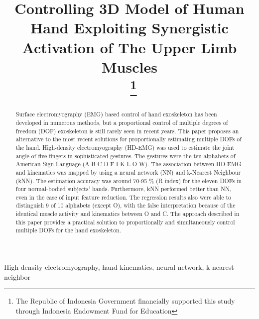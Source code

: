 \documentclass[conference]{IEEEtran}
\begin{document}
\title{Controlling 3D Model of Human Hand Exploiting Synergistic Activation of 
The Upper Limb Muscles\\\
\thanks{
The Republic of Indonesia Government financially supported this study through Indonesia Endowment Fund for Education}
}

\author{
}

\maketitle

\begin{abstract}
Surface electromyography (EMG) based control of hand exoskeleton has been developed in numerous methods, but a proportional control of multiple degrees of freedom (DOF) exoskeleton is still rarely seen in recent years. This paper proposes an alternative to the most recent solutions for proportionally estimating multiple DOFs of the hand. High-density electromyography (HD-EMG) was used to estimate the joint angle of five fingers in sophisticated gestures. The gestures were the ten alphabets of American Sign Language (A B C D F I K L O W). The association between HD-EMG and kinematics was mapped by using a neural network (NN) and k-Nearest Neighbour (kNN). The estimation accuracy was around 70-95 \% (R index) for the eleven DOFs in four normal-bodied subjects’ hands. Furthermore, kNN performed better than NN, even in the case of input feature reduction. The regression results also were able to distinguish 9 of 10 alphabets (except O), with the false interpretation because of the identical muscle activity and kinematics between O and C. The approach described in this paper provides a practical solution to proportionally and simultaneously control multiple DOFs for the hand exoskeleton.
\end{abstract}

\begin{IEEEkeywords}
High-density electromyography, hand kinematics, neural network, k-nearest 
neighbor
\end{IEEEkeywords}
\end{document}

